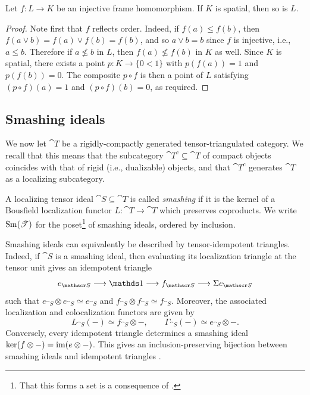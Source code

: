 \documentclass{amsart}
\begin{document}
    \begin{Lem}\label{lem:subframe-of-spatial-frame}
        Let $f \colon L \to K$ be an injective frame homomorphism. If $K$ is spatial, then so is $L$. 
    \end{Lem}
    \begin{proof}
        Note first that $f$ reflects order. Indeed, if $f(a) \le f(b)$, then $f(a \vee b) = f(a) \vee f(b) = f(b)$, and so $a \vee b = b$ since $f$ is injective, i.e., $a \le b$. Therefore if $a \nleq b$ in $L$, then $f(a) \nleq f(b)$ in $K$ as well. Since $K$ is spatial, there exists a point $p \colon K \to \{ 0 < 1 \}$ with $p(f(a)) = 1$ and $p(f(b)) = 0$. The composite $p \circ f$ is then a point of $L$ satisfying $(p \circ f)(a) = 1$ and $(p \circ f)(b) = 0$, as required. 
    \end{proof}
    \subsection{Smashing ideals}
    We now let $\cat T$ be a rigidly-compactly generated tensor-triangulated category. We recall that this means that the subcategory $\cat T^c \subseteq \cat T$ of compact objects coincides with that of rigid (i.e., dualizable)
    objects, and that $\cat T^c$ generates $\cat T$ as a localizing subcategory. 
    \begin{Def}
        A localizing tensor ideal $\cat S \subseteq \cat T$ is called \emph{smashing} if it is the kernel of a Bousfield localization functor $L \colon \cat T \to \cat T$ which preserves coproducts. We write $\operatorname{Sm}(\mathscr{T})$ for the poset\footnote{That this forms a set is a consequence of \cite[Theorem 1.3 and Corollary 2.15]{BalmerKrauseStevenson2020Frame}.} of smashing ideals, ordered by inclusion.
    \end{Def}
    \begin{Rem}\label{rem:smashing-ideals-and-idempotents}
        Smashing ideals can equivalently be described by tensor-idempotent triangles. Indeed, if $\cat S$ is a smashing ideal, then evaluating its localization triangle at the tensor unit gives an idempotent triangle
        \[
            e_{\cat S}\longrightarrow\unit \longrightarrow f_{\cat S}\longrightarrow\Sigma e_{\cat S}
        \]
        such that $e_{\cat S}\otimes e_{\cat S}\simeq e_{\cat S}$ and $f_{\cat S}\otimes f_{\cat S}\simeq f_{\cat S}$. Moreover, the associated localization and colocalization functors are given by
        \[
            L_{\cat S}(-)\simeq f_{\cat S}\otimes-,\qquad \Gamma_{\cat S}(-)\simeq e_{\cat S}\otimes-.
        \]
        Conversely, every idempotent triangle determines a smashing ideal $\ker(f\otimes-)=\operatorname{im}(e\otimes-)$. This gives an inclusion-preserving bijection between smashing ideals and idempotent triangles \cite[Theorems 2.13 and 3.5]{BalmerFavi2011Generalized}.
    \end{Rem}
\end{document}

